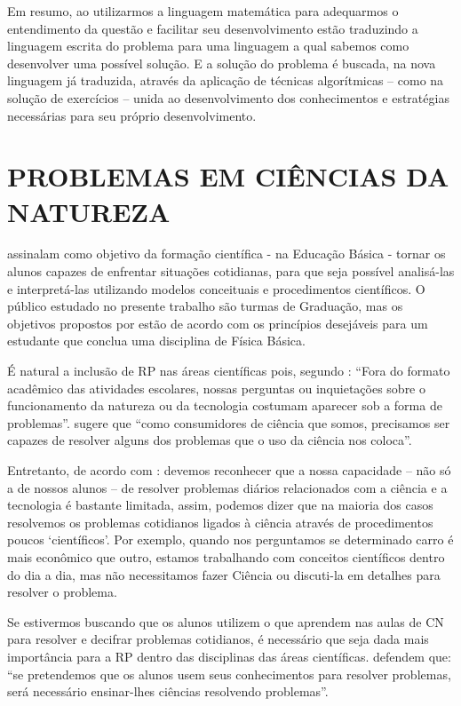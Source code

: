 Em resumo, ao utilizarmos a linguagem matemática para adequarmos o entendimento da questão e facilitar seu desenvolvimento estão traduzindo a linguagem escrita do problema para uma linguagem a qual sabemos como desenvolver uma possível solução. E a solução do problema é buscada, na nova linguagem já traduzida, através da aplicação de técnicas algorítmicas – como na solução de exercícios – unida ao desenvolvimento dos conhecimentos e estratégias necessárias para seu próprio desenvolvimento.

\section{PROBLEMAS EM CIÊNCIAS DA NATUREZA}

 assinalam como objetivo da formação científica - na Educação Básica - tornar os alunos capazes de enfrentar situações cotidianas, para que seja possível analisá-las e interpretá-las utilizando modelos conceituais e procedimentos científicos. O público estudado no presente trabalho são turmas de Graduação, mas os objetivos propostos por  estão de acordo com os princípios desejáveis para um estudante que conclua uma disciplina de Física Básica. 

É natural a inclusão de RP nas áreas científicas pois, segundo : “Fora do formato acadêmico das atividades escolares, nossas perguntas ou inquietações sobre o funcionamento da natureza ou da tecnologia costumam aparecer sob a forma de problemas”.  sugere que “como consumidores de ciência que somos, precisamos ser capazes de resolver alguns dos problemas que o uso da ciência nos coloca”. 

Entretanto, de acordo com : devemos reconhecer que a nossa capacidade – não só a de nossos alunos – de resolver problemas diários relacionados com a ciência e a tecnologia é bastante limitada, assim, podemos dizer que na maioria dos casos resolvemos os problemas cotidianos ligados à ciência através de procedimentos poucos ‘científicos’. Por exemplo, quando nos perguntamos se determinado carro é mais econômico que outro, estamos trabalhando com conceitos científicos dentro do dia a dia, mas não necessitamos fazer Ciência ou discuti-la em detalhes para resolver o problema. 

Se estivermos buscando que os alunos utilizem o que aprendem nas aulas de CN para resolver e decifrar problemas cotidianos, é necessário que seja dada mais importância para a RP dentro das disciplinas das áreas científicas.  defendem que: “se pretendemos que os alunos usem seus conhecimentos para resolver problemas, será necessário ensinar-lhes ciências resolvendo problemas”. 

